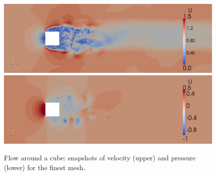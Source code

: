 \begin{figure}
  \centering
  \includegraphics[width=\largefig]{chapters/hoffman-1/png/fig2b.png}
  \medskip
  \includegraphics[width=\largefig]{chapters/hoffman-1/png/fig2c.png}
  \caption{Flow around a cube: snapshots of velocity (upper) and pressure
    (lower) for the finest mesh.}
  \label{fig:cube2}
\end{figure}

